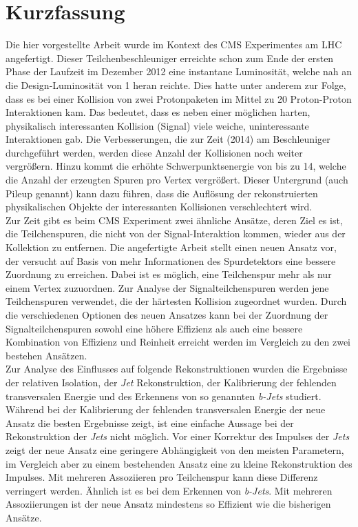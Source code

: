 
\chapter*{Kurzfassung}

Die hier vorgestellte Arbeit wurde im Kontext des CMS Experimentes am LHC angefertigt. Dieser Teilchenbeschleuniger erreichte schon zum Ende der ersten Phase der Laufzeit im Dezember 2012 eine instantane Luminosit\"a{}t, welche nah an die Design-Luminosit\"a{}t von 1\percms{} heran reichte. Dies hatte unter anderem zur Folge, dass es bei einer Kollision von zwei Protonpaketen im Mittel zu 20 Proton-Proton Interaktionen kam. Das bedeutet, dass es neben einer m\"o{}glichen harten, physikalisch interessanten Kollision (Signal) viele weiche, uninteressante Interaktionen gab. Die Verbesserungen, die zur Zeit (2014) am Beschleuniger durchgef\"u{}hrt werden, werden diese Anzahl der Kollisionen noch weiter vergr\"o{}\ss{}ern. Hinzu kommt die erh\"o{}hte Schwerpunktsenergie von bis zu 14\TeV{}, welche die Anzahl der erzeugten Spuren pro Vertex vergr\"o{}\ss{}ert. Dieser Untergrund (auch Pileup genannt) kann dazu f\"u{}hren, dass die Aufl\"o{}sung der rekonstruierten physikalischen Objekte der interessanten Kollisionen verschlechtert wird. \\
Zur Zeit gibt es beim CMS Experiment zwei \"a{}hnliche Ans\"a{}tze, deren Ziel es ist, die Teilchenspuren, die nicht von der Signal-Interaktion kommen, wieder aus der Kollektion zu entfernen. Die angefertigte Arbeit stellt einen neuen Ansatz vor, der versucht auf Basis von mehr Informationen des Spurdetektors eine bessere Zuordnung zu erreichen. Dabei ist es m\"o{}glich, eine Teilchenspur mehr als nur einem Vertex zuzuordnen. Zur Analyse der Signalteilchenspuren werden jene Teilchenspuren verwendet, die der h\"a{}rtesten Kollision zugeordnet wurden. Durch die verschiedenen Optionen des neuen Ansatzes kann bei der Zuordnung der Signalteilchenspuren sowohl eine h\"o{}here Effizienz als auch eine bessere Kombination von Effizienz und Reinheit erreicht werden im Vergleich zu den zwei bestehen Ans\"a{}tzen. \\
Zur Analyse des Einflusses auf folgende Rekonstruktionen wurden die Ergebnisse der relativen Isolation, der \textit{Jet} Rekonstruktion, der Kalibrierung der fehlenden transversalen Energie und des Erkennens von so genannten \textit{b-Jets} studiert. W\"a{}hrend bei der Kalibrierung der fehlenden transversalen Energie der neue Ansatz die besten Ergebnisse zeigt, ist eine einfache Aussage bei der Rekonstruktion der \textit{Jets} nicht m\"o{}glich. Vor einer Korrektur des Impulses der \textit{Jets} zeigt der neue Ansatz eine geringere Abh\"a{}ngigkeit von den meisten Parametern, im Vergleich aber zu einem bestehenden Ansatz eine zu kleine Rekonstruktion des Impulses. Mit mehreren Assoziieren pro Teilchenspur kann diese Differenz verringert werden. \"A{}hnlich ist es bei dem Erkennen von \textit{b-Jets}. Mit mehreren Assoziierungen ist der neue Ansatz mindestens so Effizient wie die bisherigen Ans\"a{}tze.\\
